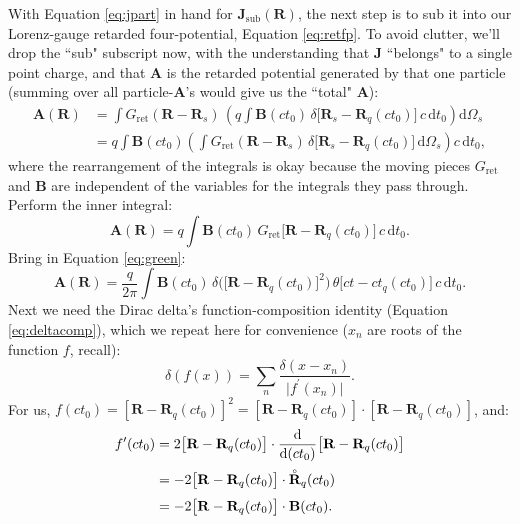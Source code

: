 \documentclass[12pt]{article}
\renewcommand{\mathring}[1]{\accentset{\circ}{#1}}
\renewcommand{\vv}[1]{\mathbf{#1}}
\newcommand{\dd}[1]{\mathrm{d}#1}
\begin{document}
With Equation \ref{eq:jpart} in hand for $\vv J_{\mathrm{sub}} (\vv R)$, the next step is to sub it into our Lorenz-gauge retarded four-potential, Equation \ref{eq:retfp}. To avoid clutter, we'll drop the ``sub" subscript now, with the understanding that $\vv J$ ``belongs" to a single point charge, and that $\vv A$ is the retarded potential generated by that one particle (summing over all particle-$\vv A$'s would give us the ``total" $\vv A$):
\begin{equation*}
\begin{aligned}
\vv A(\vv R) &= \int G_{\textrm{ret}} ( \vv R - \vv R_{s} ) \, \left( q \int \vv B(ct_0) \, \delta \big[ \vv R_{s} - \vv R_q (ct_0) \big] \, c \, \dd t_0 \right)  \dd \Omega_{s} \\
&= q \int \vv B(ct_0) \left( \int G_{\textrm{ret}} ( \vv R - \vv R_{s} ) \, \delta \big[ \vv R_{s} - \vv R_q (ct_0) \big] \, \dd \Omega_{s} \right)  c \, \dd t_0 ,
\end{aligned}
\end{equation*}
where the rearrangement of the integrals is okay because the moving pieces $G_{\mathrm{ret}}$ and $\vv B$ are independent of the variables for the integrals they pass through. Perform the inner integral:
\begin{equation*}
\vv A(\vv R) = q \int \vv B(ct_0) \, G_{\textrm{ret}} \big[ \vv R - \vv R_q (ct_0) \big] \, c \, \dd t_0 .
\end{equation*}
Bring in Equation \ref{eq:green}:
\begin{equation}\label{eq:covlien0}
\vv A(\vv R) = \dfrac{q}{2 \pi} \int \vv B(ct_0) \, \delta \Big( \big[ \vv R - \vv R_q (ct_0) \big]^2 \Big) \, \theta \big[ ct - ct_{q} (ct_0) \big] \, c \, \dd t_0 .
\end{equation}
Next we need the Dirac delta's function-composition identity (Equation \ref{eq:deltacomp}), which we repeat here for convenience ($x_n$ are roots of the function $f$, recall):
\begin{equation*}
\delta (f(x)) = \sum_{n} \dfrac{\delta(x - x_n)}{\vert f ^\prime (x_n) \vert} .
\end{equation*}
For us, $f (ct_0) = [\vv R - \vv R_{q}(ct_0)]^2 = [\vv R - \vv R_{q}(ct_0)] \cdot [\vv R - \vv R_{q}(ct_0)]$, and:
\begin{equation*}
\begin{aligned}
f ^\prime (ct_0) &= 2 \big[ \vv R - \vv R_{q} (ct_0) \big] \cdot \dfrac{\dd}{\dd (ct_0)}  \big[ \vv R - \vv R_q (ct_0) \big] \\[2pt]
&= - 2 \big[ \vv R - \vv R_{q} (ct_0) \big] \cdot \mathring{\vv R}_{q} (ct_0) \\[3pt]
&= - 2 \big[ \vv R - \vv R_{q} (ct_0) \big] \cdot \vv B (ct_0) .
\end{aligned}
\end{equation*}
\end{document}
